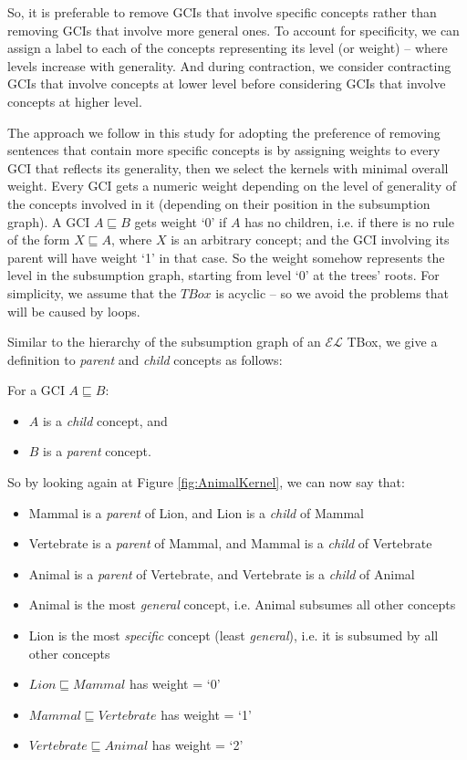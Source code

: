 So, it is preferable to remove GCIs that involve specific concepts rather than removing GCIs that involve more general ones. To account for specificity, we can assign a label to each of the concepts representing its level (or weight) -- where levels increase with generality. And during contraction, we consider contracting GCIs that involve concepts at lower level before considering GCIs that involve concepts at higher level.

The approach we follow in this study for adopting the preference of removing sentences that contain more specific concepts is by assigning weights to every GCI that reflects its generality, then we select the kernels with minimal overall weight. Every GCI gets a numeric weight depending on the level of generality of the concepts involved in it (depending on their position in the subsumption graph). A GCI $A \sqsubseteq B$ gets weight `0' if $A$ has no children, i.e. if there is no rule of the form $X \sqsubseteq A$, where $X$ is an arbitrary concept; and the GCI involving its parent will have weight `1' in that case. So the weight somehow represents the level in the subsumption graph, starting from level `0' at the trees' roots. For simplicity, we assume that the $TBox$ is acyclic -- so we avoid the problems that will be caused by loops.


Similar to the hierarchy of the subsumption graph of an $\mathcal{EL}$ TBox, we give a definition to \textit{parent} and \textit{child} concepts as follows:
\begin{defn}
\label{defn:Parent-Child}
For a GCI $A \sqsubseteq B$:
\begin{itemize}
\item $A$ is a \textit{child} concept, and
\item $B$ is a \textit{parent} concept.\\
\end{itemize}
\end{defn}

So by looking again at Figure \ref{fig:AnimalKernel}, we can now say that:
\begin{itemize}
\item Mammal is a \textit{parent} of Lion, and Lion is a \textit{child} of Mammal
\item Vertebrate is a \textit{parent} of Mammal, and Mammal is a \textit{child} of Vertebrate
\item Animal is a \textit{parent} of Vertebrate, and Vertebrate is a \textit{child} of Animal
\item Animal is the most \textit{general} concept, i.e. Animal subsumes all other concepts
\item Lion is the most \textit{specific} concept (least \textit{general}), i.e. it is subsumed by all other concepts
\item $Lion \sqsubseteq Mammal$ has weight = `0'
\item $Mammal \sqsubseteq Vertebrate$ has weight = `1'
\item $Vertebrate \sqsubseteq Animal$ has weight = `2'
\end{itemize}

